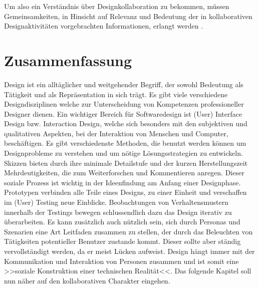 Um also ein Verständnis über Designkollaboration zu bekommen, müssen Gemeinsamkeiten, in Hinsicht auf Relevanz und Bedeutung der in kollaborativen Designaktivitäten vorgebrachten Informationen, erlangt werden \citep{Hill:2001}.


\section*{Zusammenfassung}
Design ist ein alltäglicher und weitgehender Begriff, der sowohl Bedeutung als Tätigkeit und als Repräsentation in sich trägt. Es gibt viele verschiedene Designdisziplinen welche zur Unterscheidung von Kompetenzen professioneller Designer dienen. Ein wichtiger Bereich für Softwaredesign ist (User) Interface Design bzw. Interaction Design, welche sich besonders mit den subjektiven und qualitativen Aspekten, bei der Interaktion von Menschen und Computer, beschäftigen. Es gibt verschiedenste Methoden, die benutzt werden können um Designprobleme zu verstehen und um nötige Lösungsstrategien zu entwickeln. Skizzen bieten durch ihre minimale Detailstufe und der kurzen Herstellungszeit Mehrdeutigkeiten, die zum Weiterforschen und Kommentieren anregen. Dieser soziale Prozess ist wichtig in der Ideenfindung am Anfang einer Designphase. Prototypen verbinden alle Teile eines Designs, zu einer Einheit und verschaffen im (User) Testing neue Einblicke. Beobachtungen von Verhaltensmustern innerhalb der Testings bewegen schlussendlich dazu das Design iterativ zu überarbeiten. Es kann zusätzlich auch nützlich sein, sich durch Personas und Szenarien eine Art Leitfaden zusammen zu stellen, der durch das Beleuchten von Tätigkeiten potentieller Benutzer zustande kommt. Dieser sollte aber ständig vervollständigt werden, da er meist Lücken aufweist. %
Design hängt immer mit der Kommunikation und Interaktion von Personen zusammen und ist somit eine >>soziale Konstruktion einer technischen Realität<<. Das folgende Kapitel soll nun näher auf den kollaborativen Charakter eingehen.

